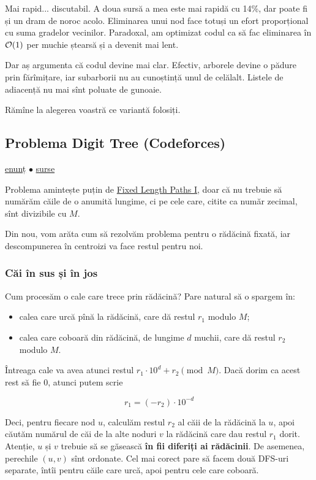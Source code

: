 \documentclass[../main.tex]{subfiles}
\begin{document}
Mai rapid... discutabil. A doua sursă a mea este mai rapidă cu 14\%, dar poate fi și un dram de noroc acolo. Eliminarea unui nod face totuși un efort proporțional cu suma gradelor vecinilor. Paradoxal, am optimizat codul ca să fac eliminarea în $\mathcal{O}(1)$ per muchie ștearsă și a devenit mai lent.

Dar aș argumenta că codul devine mai clar. Efectiv, arborele devine o pădure prin fărîmițare, iar subarborii nu au cunoștință unul de celălalt. Listele de adiacență nu mai sînt poluate de gunoaie.

Rămîne la alegerea voastră ce variantă folosiți.

\subsection{Problema Digit Tree (Codeforces)}
\label{problem:digit-tree}

\href{https://codeforces.com/contest/715/problem/C}{enunț}
$\bullet$
\hyperref[code:digit-tree]{surse}

Problema amintește puțin de \hyperref[problem:fixed-length-paths-1]{Fixed Length Paths I}, doar că nu trebuie să numărăm căile de o anumită lungime, ci pe cele care, citite ca număr zecimal, sînt divizibile cu $M$.

Din nou, vom arăta cum să rezolvăm problema pentru o rădăcină fixată, iar descompunerea în centroizi va face restul pentru noi.

\subsubsection*{Căi în sus și în jos}

Cum procesăm o cale care trece prin rădăcină? Pare natural să o spargem în:

\begin{itemize}
  \item calea care urcă  pînă la rădăcină, care dă restul $r_1$ modulo $M$;
  \item calea care coboară din rădăcină, de lungime $d$ muchii, care dă restul $r_2$ modulo $M$.
\end{itemize}

Întreaga cale va avea atunci restul $r_1 \cdot 10^d + r_2 \pmod{M}$. Dacă dorim ca acest rest să fie 0, atunci putem scrie

$$r_1 = (-r_2) \cdot 10^{-d}$$

Deci, pentru fiecare nod $u$, calculăm restul $r_2$ al căii de la rădăcină la $u$, apoi căutăm numărul de căi de la alte noduri $v$ la rădăcină care dau restul $r_1$ dorit. Atenție, $u$ și $v$ trebuie să se găsească \textbf{în fii diferiți ai rădăcinii}. De asemenea, perechile $(u,v)$ sînt ordonate. Cel mai corect pare să facem două DFS-uri separate, întîi pentru căile care urcă, apoi pentru cele care coboară.
\end{document}
